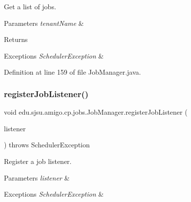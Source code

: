 Get a list of jobs.


\begin{DoxyParams}{Parameters}
{\em tenant\+Name} & \\
\hline
\end{DoxyParams}
\begin{DoxyReturn}{Returns}

\end{DoxyReturn}

\begin{DoxyExceptions}{Exceptions}
{\em Scheduler\+Exception} & \\
\hline
\end{DoxyExceptions}


Definition at line 159 of file Job\+Manager.\+java.

\mbox{\label{classedu_1_1sjsu_1_1amigo_1_1cp_1_1jobs_1_1_job_manager_a5d286042b6dee04bf407a0ad0dfc90bf}} 
\subsubsection{\texorpdfstring{register\+Job\+Listener()}{registerJobListener()}\hspace{0.1cm}{\footnotesize\ttfamily [1/2]}}
{\footnotesize\ttfamily void edu.\+sjsu.\+amigo.\+cp.\+jobs.\+Job\+Manager.\+register\+Job\+Listener (\begin{DoxyParamCaption}\item[{Job\+Listener}]{listener }\end{DoxyParamCaption}) throws Scheduler\+Exception}

Register a job listener.


\begin{DoxyParams}{Parameters}
{\em listener} & \\
\hline
\end{DoxyParams}

\begin{DoxyExceptions}{Exceptions}
{\em Scheduler\+Exception} & \\
\hline
\end{DoxyExceptions}


